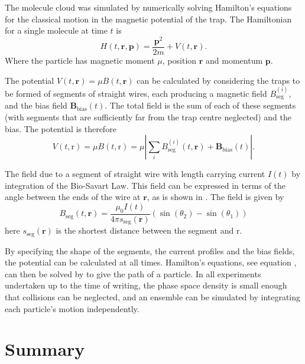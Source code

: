 
The molecule cloud was simulated by numerically solving Hamilton's equations
for the classical motion in the magnetic potential of the trap. The Hamiltonian
for a single molecule at time $t$ is
%
\begin{equation}
  H(t, \mathbf{r}, \mathbf{p}) = \frac{\mathbf{p}^2}{2m} + V(t, \mathbf{r}).
\end{equation}
Where the particle has magnetic moment $\mu$, position $\mathbf{r}$ and
momentum $\mathbf{p}$.

The potential $V(t, \mathbf{r}) = \mu B(t, \mathbf{r})$ can be calculated by
considering the traps to be formed of segments of straight wires, each
producing a magnetic field $B_\text{seg}^{(i)}$, and the bias field
$\mathbf{B}_\text{bias}(t)$. The total field is the sum of each of these
segments (with segments that are sufficiently far from the trap centre
neglected) and the bias. The potential is therefore
%
\begin{equation}
  V(t, \mathrm{r}) = \mu B (t, \mathrm{r}) = \mu \left| \sum_i
  B_\text{seg}^{(i)}(t, \mathbf{r}) +
  \mathbf{B}_\text{bias}(t)\right|.
\end{equation}

The field due to a segment of straight wire with length carrying current $I(t)$
 by integration of the Bio-Savart Law.
This field can be expressed in terms of the angle between the ends of the wire
at $\mathbf{r}$, as is shown in . The field
is given by~\cite{Griffiths2017}
%
\begin{equation}
  B_\text{seg}(t, \mathbf{r}) = \frac{\mu_0 I(t)}{4\pi
  s_\text{seg}(\mathbf{r})} (\sin(\theta_2)  - \sin(\theta_1))
\end{equation}
here $s_\text{seg}(\mathbf{r})$ is the shortest distance between the segment
and $\mathrm{r}$.

By specifying the shape of the segments, the current profiles and the bias
fields, the potential can be calculated at all times. Hamilton's equations, see
equation , can then be solved by  to give the path of a
particle. In all \CaF experiments undertaken up to the time of writing, the
phase space density is small enough that collisions can be neglected, and an
ensemble can be simulated by integrating each particle's motion independently.


\section{Summary}

